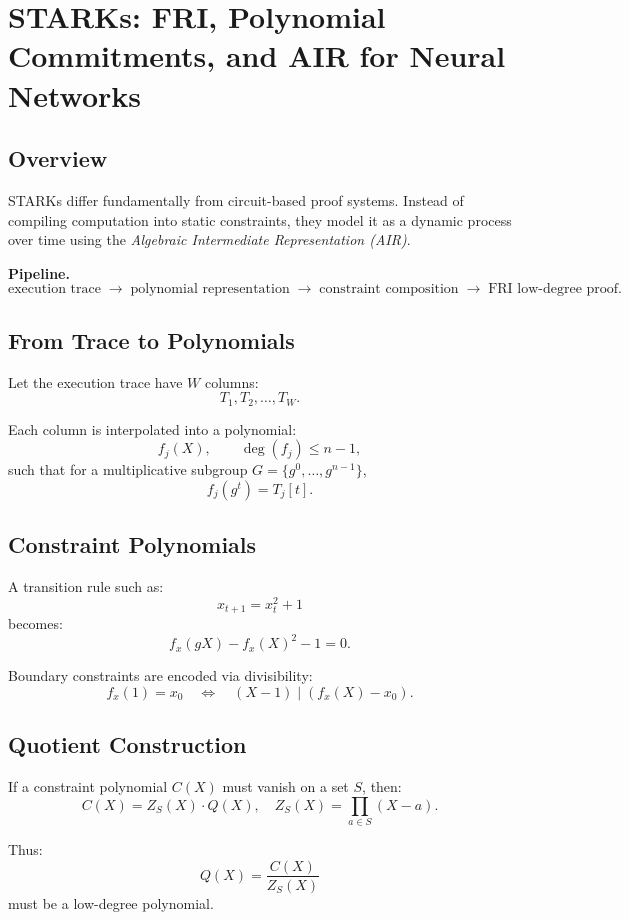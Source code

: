 \section{STARKs: FRI, Polynomial Commitments, and AIR for Neural Networks}

\subsection{Overview}

STARKs differ fundamentally from circuit-based proof systems.  
Instead of compiling computation into static constraints, they model it as a dynamic process over time using the \emph{Algebraic Intermediate Representation (AIR)}.

\medskip

\noindent
\textbf{Pipeline.}
\[
\text{execution trace}
\;\longrightarrow\;
\text{polynomial representation}
\;\longrightarrow\;
\text{constraint composition}
\;\longrightarrow\;
\text{FRI low-degree proof}.
\]

\subsection{From Trace to Polynomials}

Let the execution trace have $W$ columns:
\[
T_1, T_2, \dots, T_W.
\]

Each column is interpolated into a polynomial:
\[
f_j(X), \qquad \deg(f_j) \le n-1,
\]
such that for a multiplicative subgroup $G=\{g^0,\dots,g^{n-1}\}$,
\[
f_j(g^t) = T_j[t].
\]

\subsection{Constraint Polynomials}

A transition rule such as:
\[
x_{t+1} = x_t^2 + 1
\]
becomes:
\[
f_x(gX) - f_x(X)^2 - 1 = 0.
\]

Boundary constraints are encoded via divisibility:
\[
f_x(1) = x_0
\quad \Longleftrightarrow \quad
(X-1) \mid (f_x(X) - x_0).
\]

\subsection{Quotient Construction}

If a constraint polynomial $C(X)$ must vanish on a set $S$, then:
\[
C(X) = Z_S(X) \cdot Q(X),
\quad
Z_S(X) = \prod_{a \in S} (X-a).
\]

Thus:
\[
Q(X) = \frac{C(X)}{Z_S(X)}
\]
must be a low-degree polynomial.

